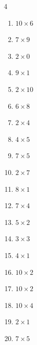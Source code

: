 \begin{multicols}{4}
\begin{enumerate}
  \item $10\times 6$
        \phantom{$=60$}

  \item $7\times 9$
        \phantom{$=63$}

  \item $2\times 0$
        \phantom{$=0$}

  \item $9\times 1$
        \phantom{$=9$}

  \item $2\times 10$
        \phantom{$=20$}

  \item $6\times 8$
        \phantom{$=48$}

  \item $2\times 4$
        \phantom{$=8$}

  \item $4\times 5$
        \phantom{$=20$}

  \item $7\times 5$
        \phantom{$=35$}

  \item $2\times 7$
        \phantom{$=14$}

  \item $8\times 1$
        \phantom{$=8$}

\columnbreak %

\resetques

  \item $7\times 4$
        \phantom{$=28$}

  \item $5\times 2$
        \phantom{$=10$}

  \item $3\times 3$
        \phantom{$=9$}

  \item $4\times 1$
        \phantom{$=4$}

  \item $10\times 2$
        \phantom{$=20$}

  \item $10\times 2$
        \phantom{$=20$}

  \item $10\times 4$
        \phantom{$=40$}

  \item $2\times 1$
        \phantom{$=2$}

  \item $7\times 5$
        \phantom{$=35$}


\end{enumerate}
\end{multicols}
